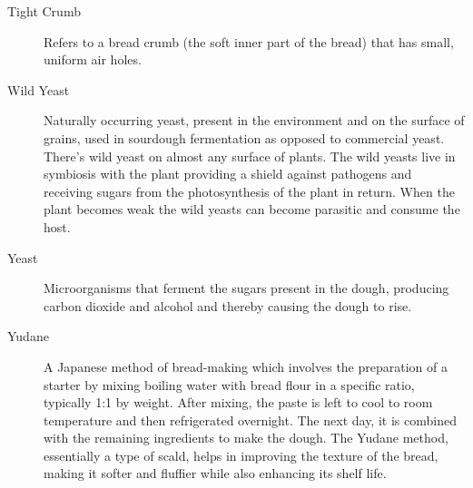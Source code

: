 \begin{description}
\item[Tight Crumb] Refers to a bread crumb (the soft inner part of the bread) that
has small, uniform air holes.

\item[Wild Yeast] Naturally occurring yeast, present in the environment and on the
surface of grains, used in sourdough fermentation as opposed to commercial yeast.
There’s wild yeast on almost any surface of plants. The wild yeasts live in symbiosis
with the plant providing a shield against pathogens and receiving sugars from the
photosynthesis of the plant in return. When the plant becomes weak the wild yeasts
can become parasitic and consume the host.

\item[Yeast] Microorganisms that ferment the sugars present in the dough, producing
carbon dioxide and alcohol and thereby causing the dough to rise.

\item[Yudane] A Japanese method of bread-making which involves the preparation
of a starter by mixing boiling water with bread flour in a specific ratio, typically 1:1
by weight. After mixing, the paste is left to cool to room temperature and then
refrigerated overnight. The next day, it is combined with the remaining ingredients
to make the dough. The Yudane method, essentially a type of scald, helps in
improving the texture of the bread, making it softer and fluffier while also enhancing
its shelf life.

\end{description}
